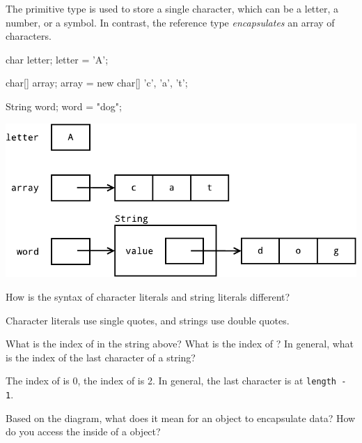 
The primitive type  is used to store a single character, which can be a letter, a number, or a symbol.
In contrast, the reference type  \emph{encapsulates} an array of characters.

\begin{minipage}[t]{150pt}
\begin{javalst}
char letter;
letter = 'A';

char[] array;
array = new char[]
        {'c', 'a', 't'};

String word;
word = "dog";
\end{javalst}
\end{minipage}
\hfill
\begin{minipage}[t]{345pt}
\null
\includegraphics[width=\linewidth]{string1.pdf}
\null
\end{minipage}




\Q How is the syntax of character literals and string literals different?

\begin{answer}
Character literals use single quotes, and strings use double quotes.
\end{answer}


\Q What is the index of  in the string above?
What is the index of ?
In general, what is the index of the last character of a string?

\begin{answer}
The index of  is 0, the index of  is 2.
In general, the last character is at {\tt length - 1}.
\end{answer}


\Q \label{encap}
Based on the diagram, what does it mean for an object to encapsulate data?
How do you access the  inside of a  object?

